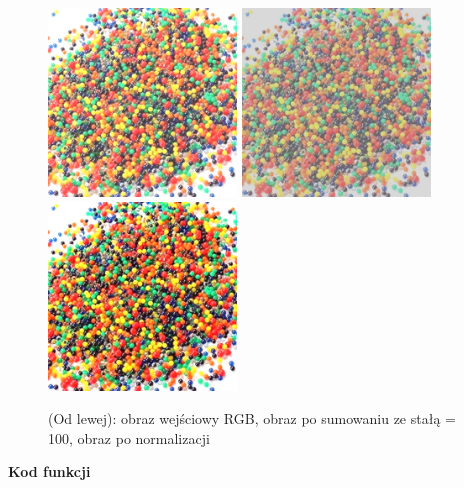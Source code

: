 \documentclass[magisterska,openany]{pracadypl}
\begin{document}
\begin{figure}[h]
\centering
\includegraphics[width=5cm, height=5cm]{orgi/RGBkulki.jpg}
\includegraphics[width=5cm, height=5cm]{4_1/addconstRGB2.jpg}
\includegraphics[width=5cm, height=5cm]{4_1/naddconstRGB2.jpg}
\caption{(Od lewej): obraz wejściowy RGB, obraz po sumowaniu ze stałą = 100, obraz po normalizacji}
\end{figure}

\newpage
\textbf{\Large Kod funkcji}
   
\end{document}
